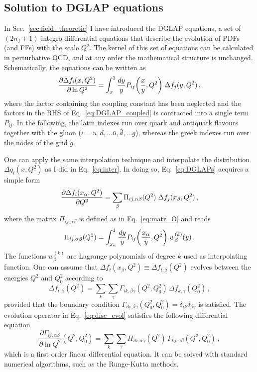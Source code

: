 \subsection*{Solution to DGLAP equations}
In Sec.~\ref{sec:field_theoretic} I have introduced the DGLAP equations, a set of $(2 n_f + 1)$ integro-differential equations that describe the evolution of PDFs (and FFs) with the scale $Q^2$. The kernel of this set of equations can be calculated in perturbative QCD, and at any order the mathematical structure is unchanged. Schematically, the equations can be written as 
\begin{equation}
  \pdv{\Delta f_i(x, Q^2)}{\ln Q^2} = \int_x^1 \frac{dy}{y} P_{ij} \qty(\frac{x}{y}, Q^2) \; \Delta f_j(y,Q^2) \, ,
  \label{eq:DGLAPs}
\end{equation} 
where the factor containing the coupling constant has been neglected and the factors in the RHS of Eq.~\eqref{eq:DGLAP_coupled} is contracted into a single term $P_{ij}$. In the following, the latin indexes run over quark and antiquark flavours together with the gluon ($i=u,d,\dots \bar{u},\bar{d}, \dots g$), whereas the greek indexes run over the nodes of the grid $g$.%

One can apply the same interpolation technique and interpolate the distribution $\Delta q_{i}(x,Q^2)$ as I did in Eq.~\eqref{eq:inter}. In doing so, Eq.~\eqref{eq:DGLAPs} acquires a simple form
\begin{equation}
  \pdv{\Delta f_i(x_{\alpha},Q^2)}{Q^2} = \sum_{\beta} \Pi_{ij,\alpha \beta} (Q^2) \; \Delta f_j(x_{\beta}, Q^2) \,,
  \label{eq:DGLAP_recast}
\end{equation}
where the matrix $\Pi_{ij,\alpha \beta}$ is defined as in Eq.~\eqref{eq:matr_O} and reads
\begin{equation}
  \Pi_{ij,\alpha \beta} (Q^2) = \int_{x_{\alpha}}^1 \frac{dy}{y} P_{ij} \qty(\frac{x_{\alpha}}{y}, Q^2) \; w_{\beta}^{(k)} (y)\,.
\end{equation}
The functions $w_{\beta}^{(k)}$ are Lagrange polynomials of degree $k$ used as interpolating function. One can assume that $\Delta f_i(x_{\beta},Q^2) \equiv \Delta f_{i,\beta}(Q^2)$ evolves between the energies $Q^2$ and $Q^2_0$ according to
\begin{equation}
  \Delta f_{i,\beta} (Q^2) = \sum_{k} \sum_{\gamma} \Gamma_{ik,\beta \gamma} (Q^2,Q^2_0) \, \Delta f_{k,\gamma} (Q^2_0) \,,
  \label{eq:disc_evol}
\end{equation}
provided that the boundary condition $\Gamma_{ik,\beta \gamma} (Q^2_0,Q^2_0) = \delta_{ik} \delta_{\beta \gamma}$ is satisfied. The evolution operator in Eq.~\eqref{eq:disc_evol} satisfies the following differential equation
\begin{equation}
  \frac{\partial \Gamma_{ij,\alpha \beta} }{\partial \ln Q^2} (Q^2,Q^2_0) = \sum_{k} \sum_{\gamma} \Pi_{ik,\alpha \gamma}(Q^2) \, \Gamma_{kj,\gamma \beta}(Q^2,Q^2_0)  \,,
  \label{eq:sys_DGLAP_kernel}
\end{equation}
which is a first order linear differential equation. It can be solved with standard numerical algorithms, such as the Runge-Kutta methods.\par

